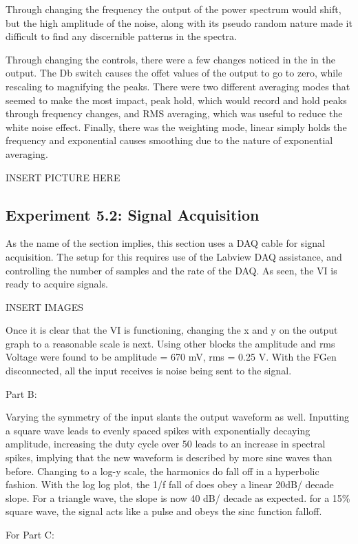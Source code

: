 \documentclass[10pt]{article}
\begin{document}
Through changing the frequency the output of the power spectrum would shift, but the high amplitude of the noise, along with its pseudo random nature made it difficult to find any discernible patterns in the spectra.

Through changing the controls, there were a few changes noticed in the in the output. The Db switch causes the offet values of the output to go to zero, while rescaling to magnifying the peaks. There were two different averaging modes that seemed to make the most impact, peak hold, which would record and hold peaks through frequency changes, and RMS averaging, which was useful to reduce the white noise effect. Finally, there was the weighting mode, linear simply holds the frequency and exponential causes smoothing due to the nature of exponential averaging.

INSERT PICTURE HERE

\subsection{Experiment 5.2: Signal Acquisition}

As the name of the section implies, this section uses a DAQ cable for signal acquisition. The setup for this requires use of the Labview DAQ assistance, and controlling the number of samples and the rate of the DAQ. As seen, the VI is ready to acquire signals.

INSERT IMAGES

Once it is clear that the VI is functioning, changing the x and y on the output graph to a reasonable scale is next. Using other blocks the amplitude and rms Voltage were found to be amplitude = 670 mV, rms = 0.25 V. With the FGen disconnected, all the input receives is noise being sent to the signal.

Part B:

Varying the symmetry of the input slants the output waveform as well. Inputting a square wave leads to evenly spaced spikes with exponentially decaying amplitude, increasing the duty cycle over 50 leads to an increase in spectral spikes, implying that the new waveform is described by more sine waves than before. Changing to a log-y scale, the harmonics do fall off in a hyperbolic fashion. With the log log plot, the 1/f fall of does obey a linear 20dB/ decade slope. For a triangle wave, the slope is now 40 dB/ decade as expected. for a 15\% square wave, the signal acts like a pulse and obeys the sinc function falloff. 

For Part C: 
\end{document}
